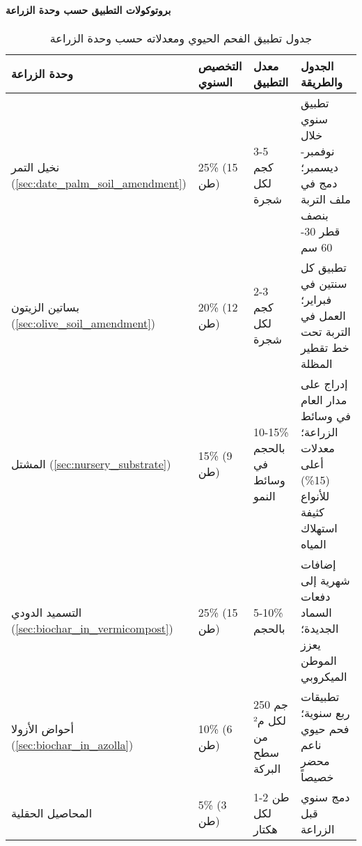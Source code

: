 \paragraph{بروتوكولات التطبيق حسب وحدة الزراعة}
\label{sec:biochar_application}
\begin{table}[h]
\centering
\caption{جدول تطبيق الفحم الحيوي ومعدلاته حسب وحدة الزراعة}
\label{tab:biochar_application}
\begin{tabular}{|p{2.5cm}|p{2cm}|p{2.5cm}|p{5cm}|}
\hline
\textbf{وحدة الزراعة} & \textbf{التخصيص السنوي} & \textbf{معدل التطبيق} & \textbf{الجدول والطريقة} \\
\hline
نخيل التمر (\ref{sec:date_palm_soil_amendment}) & 25\% (15 طن) & 3-5 كجم لكل شجرة & تطبيق سنوي خلال نوفمبر-ديسمبر؛ دمج في ملف التربة بنصف قطر 30-60 سم \\
\hline
بساتين الزيتون (\ref{sec:olive_soil_amendment}) & 20\% (12 طن) & 2-3 كجم لكل شجرة & تطبيق كل سنتين في فبراير؛ العمل في التربة تحت خط تقطير المظلة \\
\hline
المشتل (\ref{sec:nursery_substrate}) & 15\% (9 طن) & 10-15\% بالحجم في وسائط النمو & إدراج على مدار العام في وسائط الزراعة؛ معدلات أعلى (15\%) للأنواع كثيفة استهلاك المياه \\
\hline
التسميد الدودي (\ref{sec:biochar_in_vermicompost}) & 25\% (15 طن) & 5-10\% بالحجم & إضافات شهرية إلى دفعات السماد الجديدة؛ يعزز الموطن الميكروبي \\
\hline
أحواض الأزولا (\ref{sec:biochar_in_azolla}) & 10\% (6 طن) & 250 جم لكل م² من سطح البركة & تطبيقات ربع سنوية؛ فحم حيوي ناعم محضر خصيصاً \\
\hline
المحاصيل الحقلية & 5\% (3 طن) & 1-2 طن لكل هكتار & دمج سنوي قبل الزراعة \\
\hline
\end{tabular}
\end{table}

